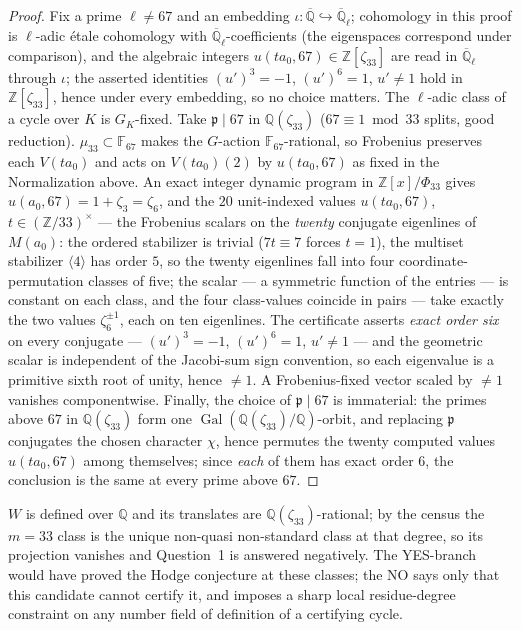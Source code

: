 \documentclass[11pt]{amsart}
\theoremstyle{remark}
\newcommand{\Q}{\mathbb{Q}}
\newcommand{\Z}{\mathbb{Z}}
\newcommand{\F}{\mathbb{F}}
\newcommand{\V}{V}
\DeclareMathOperator{\Gal}{Gal}
\newcommand{\zt}{\zeta}
\newcommand{\Qbar}{\overline{\Q}}
\begin{document}
\begin{proof}
Fix a prime $\ell\neq67$ and an embedding $\iota\colon\Qbar\hookrightarrow\Qbar_\ell$;
cohomology in this proof is $\ell$-adic \'etale cohomology with $\Qbar_\ell$-coefficients
(the eigenspaces correspond under comparison), and the algebraic integers
$u(ta_0,67)\in\Z[\zt_{33}]$ are read in $\Qbar_\ell$ through $\iota$; the asserted
identities $(u')^3=-1$, $(u')^6=1$, $u'\neq1$ hold in $\Z[\zt_{33}]$, hence under every
embedding, so no choice matters. The $\ell$-adic class of a cycle over $K$ is $G_K$-fixed. Take $\mathfrak p\mid67$ in $\Q(\zt_{33})$
($67\equiv1\bmod33$ splits, good reduction). $\mu_{33}\subset\F_{67}$ makes the $G$-action
$\F_{67}$-rational, so Frobenius preserves each $\V(ta_0)$ and acts on $\V(ta_0)(2)$ by
$u(ta_0,67)$ as fixed in the Normalization above. An exact
integer dynamic program in $\Z[x]/\Phi_{33}$ gives $u(a_0,67)=1+\zt_3=\zt_6$, and the $20$ unit-indexed
values $u(ta_0,67)$, $t\in(\Z/33)^\times$ --- the Frobenius scalars on the \emph{twenty} conjugate
eigenlines of $M(a_0)$: the ordered stabilizer is trivial ($7t\equiv7$ forces $t=1$), the multiset
stabilizer $\langle4\rangle$ has order $5$, so the twenty eigenlines fall into four
coordinate-permutation classes of five; the scalar --- a symmetric function of the entries --- is
constant on each class, and the four class-values coincide in pairs --- take exactly the two
values $\zt_6^{\pm1}$, each on ten eigenlines. The certificate asserts \emph{exact order six}
on every conjugate --- $(u')^3=-1$, $(u')^6=1$, $u'\neq1$ --- and the geometric scalar is
independent of the Jacobi-sum sign convention, so each eigenvalue is a primitive sixth root of
unity, hence $\neq1$. A Frobenius-fixed vector scaled by $\neq1$ vanishes componentwise.
Finally, the choice of $\mathfrak p\mid67$ is immaterial: the primes above $67$ in
$\Q(\zt_{33})$ form one $\Gal(\Q(\zt_{33})/\Q)$-orbit, and replacing $\mathfrak p$ conjugates
the chosen character $\chi$, hence permutes the twenty computed values $u(ta_0,67)$ among
themselves; since \emph{each} of them has exact order $6$, the conclusion is the same at every
prime above $67$.
\end{proof}
$W$ is defined over $\Q$ and its translates are $\Q(\zt_{33})$-rational; by the census the $m=33$ class
is the unique non-quasi non-standard class at that degree, so its projection vanishes and Question~1 is
answered negatively. The YES-branch would have proved the Hodge conjecture at these classes; the NO says
only that this candidate cannot certify it, and imposes a sharp local residue-degree constraint
on any number field of definition of a certifying cycle.
\end{document}
